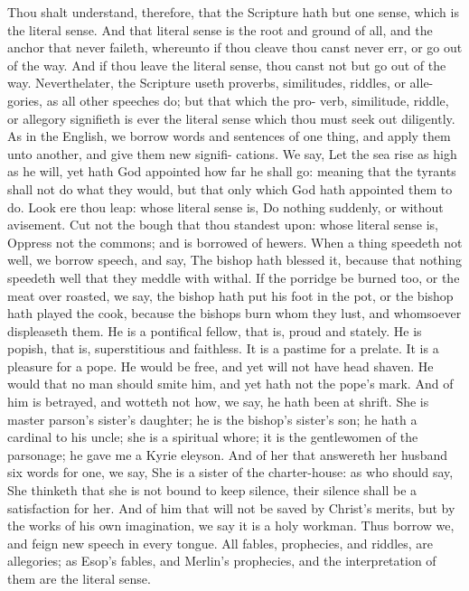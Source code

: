 \documentclass{custom}
\begin{document}
Thou shalt understand, therefore, that the Scripture hath
but one sense, which is the literal sense. And that literal
sense is the root and ground of all, and the anchor that never
faileth, whereunto if thou cleave thou canst never err, or 
go out of the way. And if thou leave the literal sense, 
thou canst not but go out of the way. Neverthelater, 
the Scripture useth proverbs, similitudes, riddles, or alle- 
gories, as all other speeches do; but that which the pro- 
verb, similitude, riddle, or allegory signifieth is ever the 
literal sense which thou must seek out diligently. As in 
the English, we borrow words and sentences of one thing, 
and apply them unto another, and give them new signifi- 
cations. We say, Let the sea rise as high as he will, yet 
hath God appointed how far he shall go: meaning that 
the tyrants shall not do what they would, but that only 
which God hath appointed them to do. Look ere thou leap: 
whose literal sense is, Do nothing suddenly, or without 
avisement. Cut not the bough that thou standest upon: 
whose literal sense is, Oppress not the commons; and is 
borrowed of hewers. When a thing speedeth not well, we 
borrow speech, and say, The bishop hath blessed it, because 
that nothing speedeth well that they meddle with withal. 
If the porridge be burned too, or the meat over roasted, 
we say, the bishop hath put his foot in the pot, or the 
bishop hath played the cook, because the bishops burn 
whom they lust, and whomsoever displeaseth them. He is a 
pontifical fellow, that is, proud and stately. He is popish, 
that is, superstitious and faithless. It is a pastime for a 
prelate. It is a pleasure for a pope. He would be free, 
and yet will not have head shaven. He would that no 
man should smite him, and yet hath not the pope's mark. 
And of him is betrayed, and wotteth not how, we say, he 
hath been at shrift. She is master parson's sister's daughter; 
he is the bishop's sister's son; he hath a cardinal to his 
uncle; she is a spiritual whore; it is the gentlewomen of 
the parsonage; he gave me a Kyrie eleyson. And of her 
that answereth her husband six words for one, we say, 
She is a sister of the charter-house: as who should say, 
She thinketh that she is not bound to keep silence, their 
silence shall be a satisfaction for her. And of him that 
will not be saved by Christ's merits, but by the works of 
his own imagination, we say it is a holy workman. Thus 
borrow we, and feign new speech in every tongue. All 
fables, prophecies, and riddles, are allegories; as Esop's 
fables, and Merlin's prophecies, and the interpretation of 
them are the literal sense. 
\end{document}
